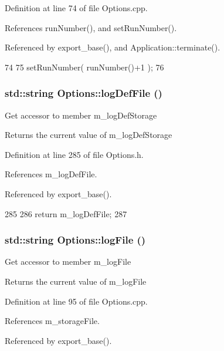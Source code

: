 Definition at line 74 of file Options.cpp.

References runNumber(), and setRunNumber().

Referenced by export\_\-base(), and Application::terminate().


\begin{DoxyCode}
74                              {
75   setRunNumber( runNumber()+1 );
76 }
\end{DoxyCode}
\hypertarget{classOptions_a5d362ec7f7969bd72c3c94b8e3d5ba97}{
\subsubsection[{logDefFile}]{\setlength{\rightskip}{0pt plus 5cm}std::string Options::logDefFile ()}}
\label{classOptions_a5d362ec7f7969bd72c3c94b8e3d5ba97}
Get accessor to member m\_\-logDefStorage \begin{DoxyReturn}{Returns}
the current value of m\_\-logDefStorage 
\end{DoxyReturn}


Definition at line 285 of file Options.h.

References m\_\-logDefFile.

Referenced by export\_\-base().


\begin{DoxyCode}
285                                 {
286                 return m_logDefFile;
287         }
\end{DoxyCode}
\hypertarget{classOptions_a739a9b788fc937ad55d10d6b47ff1e8c}{
\subsubsection[{logFile}]{\setlength{\rightskip}{0pt plus 5cm}std::string Options::logFile ()}}
\label{classOptions_a739a9b788fc937ad55d10d6b47ff1e8c}
Get accessor to member m\_\-logFile \begin{DoxyReturn}{Returns}
the current value of m\_\-logFile 
\end{DoxyReturn}


Definition at line 95 of file Options.cpp.

References m\_\-storageFile.

Referenced by export\_\-base().


